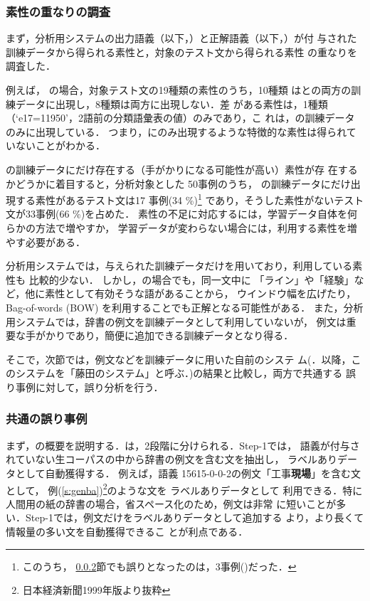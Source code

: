\documentclass[japanese]{jnlp_1.4}
\newcommand{\COR}{}
\newcommand{\SYS}{}
\newcommand{\SF}{}
\newcommand{\eid}[1]{}
\begin{document}
\subsubsection{素性の重なりの調査}\label{sec:fujita-feas}

まず，分析用システムの出力語義（以下，\SYS{}）と正解語義（以下，\COR{}）が付
与された訓練データから得られる素性と，対象のテスト文から得られる素性
の重なりを調査した．

例えば，\eid{13} の場合，対象テスト文の19種類の素性のうち，10種類
は\SYS{}と\COR{}の両方の訓練データに出現し，8種類は両方に出現しない．差
がある素性は，1種類（`e17=11950'，2語前の分類語彙表の値）のみであり，こ
れは，\SYS{}の訓練データのみに出現している．
つまり，\COR{}にのみ出現するような特徴的な素性は得られていないことがわかる．

\COR{}の訓練データにだけ存在する（手がかりになる可能性が高い）素性が存
在するかどうかに着目すると，分析対象とした 50事例のうち，
\COR{}の訓練データにだけ出現する素性があるテスト文は17 事例(34 \%)\footnote{このうち，
\ref{sec:fujita-mhle}節でも誤りとなったのは，3事例(\eid{24,42,47})だった．}
であり，そうした素性がないテスト文が33事例(66 \%)を占めた．
素性の不足に対応するには，学習データ自体を何らかの方法で増やすか，
学習データが変わらない場合には，利用する素性を増やす必要がある．


分析用システムでは，与えられた訓練データだけを用いており，利用している素性も
比較的少ない．
しかし，\eid{13}の場合でも，同一文中に
「ライン」や「経験」など，他に素性として有効そうな語があることから，
ウインドウ幅を広げたり，Bag-of-words (BOW) を利用することでも正解となる可能性がある．
また，分析用システムでは，辞書の例文を訓練データとして利用していないが，
例文は重要な手がかりであり，簡便に追加できる訓練データとなり得る．

そこで，次節では，例文などを訓練データに用いた自前のシステ
ム(\cite{Fujita:Fujino:2013}．以降，このシステムを「藤田のシステム」と呼ぶ．)の結果と比較し，両方で共通する
誤り事例に対して，誤り分析を行う．


\subsubsection{共通の誤り事例}
\label{sec:fujita-mhle}


まず，\SF{}の概要を説明する．\SF{}は，2段階に分けられる．Step-1では，
語義が付与されていない生コーパスの中から辞書の例文を含む文を抽出し，
ラベルありデータとして自動獲得する．
例えば，語義 15615-0-0-2の例文「工事{\bf 現場}」を含む文として，
例(\ref{s:genba})\footnote{日本経済新聞1999年版より抜粋}のような文を
ラベルありデータとして
利用できる．特に人間用の紙の辞書の場合，省スペース化のため，例文は非常
に短いことが多い．Step-1では，例文だけをラベルありデータとして追加する
より，より長くて情報量の多い文を自動獲得できるこ
とが利点である．
\end{document}
